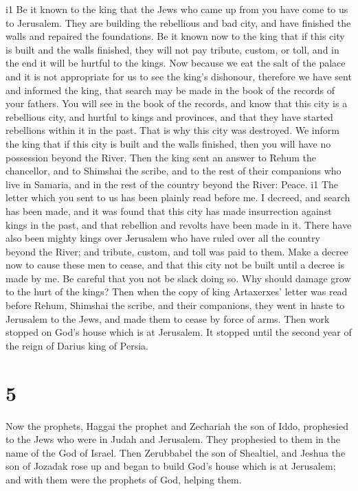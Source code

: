 i1 Be it known to the king that the Jews who came up from
you have come to us to Jerusalem. They are building the rebellious and
bad city, and have finished the walls and repaired the foundations.
 Be it known now to the king that if this city is built and
the walls finished, they will not pay tribute, custom, or toll, and in
the end it will be hurtful to the kings.  Now because we
eat the salt of the palace and it is not appropriate for us to see the
king's dishonour, therefore we have sent and informed the king,
 that search may be made in the book of the records of your
fathers. You will see in the book of the records, and know that this
city is a rebellious city, and hurtful to kings and provinces, and that
they have started rebellions within it in the past. That is why this
city was destroyed.  We inform the king that if this city
is built and the walls finished, then you will have no possession beyond
the River.  Then the king sent an answer to Rehum the
chancellor, and to Shimshai the scribe, and to the rest of their
companions who live in Samaria, and in the rest of the country beyond
the River: Peace. i1 The letter which you sent to us has
been plainly read before me.  I decreed, and search has
been made, and it was found that this city has made insurrection against
kings in the past, and that rebellion and revolts have been made in it.
 There have also been mighty kings over Jerusalem who have
ruled over all the country beyond the River; and tribute, custom, and
toll was paid to them.  Make a decree now to cause these
men to cease, and that this city not be built until a decree is made by
me.  Be careful that you not be slack doing so. Why should
damage grow to the hurt of the kings?  Then when the copy
of king Artaxerxes' letter was read before Rehum, Shimshai the scribe,
and their companions, they went in haste to Jerusalem to the Jews, and
made them to cease by force of arms.  Then work stopped on
God's house which is at Jerusalem. It stopped until the second year of
the reign of Darius king of Persia.

\hypertarget{section-4}{%
\section{5}\label{section-4}}

 Now the prophets, Haggai the prophet and Zechariah the son
of Iddo, prophesied to the Jews who were in Judah and Jerusalem. They
prophesied to them in the name of the God of Israel.  Then
Zerubbabel the son of Shealtiel, and Jeshua the son of Jozadak rose up
and began to build God's house which is at Jerusalem; and with them were
the prophets of God, helping them.

